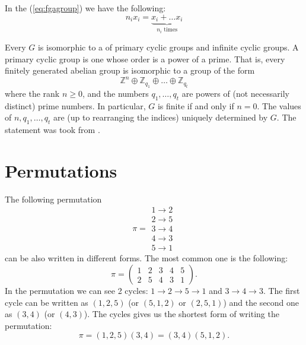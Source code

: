 \begin{appendices}
\begin{definition}
  In the (\ref{eq:fgagroup}) we have the following:
  \[
  n_i x_i = \underbrace{x_i + \dots x_i}_{n_i \text{ times}}
  \]
  \label{def:fgagroup}
\end{definition}

\begin{theorem}
  Every  $G$ is isomorphic to a
   of primary cyclic groups and infinite cyclic
  groups. A primary cyclic group is one whose order is a power of a
  prime. That is, every finitely generated abelian group is isomorphic
  to a group of the form
  \[
  \mathbb{Z}^n \oplus \mathbb{Z}_{q_1} \oplus
  \dots \oplus \mathbb{Z}_{q_t}
  \]
  where the rank $n \ge 0$, and the numbers $q_1, \dots , q_t$ are
  powers of (not 
  necessarily distinct) prime numbers. In particular, $G$ is finite if
  and only if $n = 0$. The values of $n, q_1, \dots , q_t$ are (up to
  rearranging the indices) uniquely determined by $G$. 
  The statement was took from \cite{wiki:fgagroup}.
  \label{thm:fgagroup}
\end{theorem}

\section{Permutations}

\begin{example}[Permutation]
  The following permutation
  \[ \pi = 
    \begin{array}{c}
    1 \to 2 \\
    2 \to 5 \\
    3 \to 4 \\
    4 \to 3 \\
    5 \to 1 
    \end{array}
    \]
    can be also written in different forms. The most common one is the following:
    \[
    \pi = \begin{pmatrix}
      1 & 2 & 3 & 4 & 5 \\
      2 & 5 & 4 & 3 & 1
    \end{pmatrix}.
    \]
    In the permutation we can see 2 cycles:
    $1 \to 2 \to 5 \to 1$ and $3 \to 4 \to 3$. The first cycle can be
    written as $(1,2,5)$ (or $(5,1,2)$ or $(2,5,1)$) and the second
    one as $(3,4)$ (or $(4,3)$). The cycles gives us the shortest form
    of writing the permutation:
    \[
    \pi = (1,2,5)(3,4) = (3,4)(5,1,2).
    \]
  \label{ex:permutation}
\end{example}


\end{appendices}
